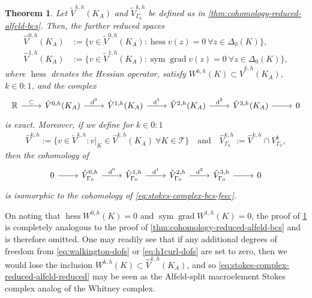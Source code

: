 \documentclass{mcom-l}
\newtheorem{theorem}{Theorem}[section]
\theoremstyle{definition}
\theoremstyle{remark}
\numberwithin{equation}{section}
\DeclareMathOperator{\grad}{grad}
\DeclareMathOperator{\hess}{hess}
\DeclareMathOperator{\dee}{d}
\DeclareMathOperator{\sym}{sym}
\newcommand{\mesh}[0]{\mathcal{T}}
\begin{document}
\begin{theorem}
	\label{thm:cohomology-reduced-alfeld-reduced-bcs}
	Let $\tilde{V}^{k, h}(K_A)$ and $\tilde{V}_{\Gamma_0}^{k ,h}$ be defined as 
	in \cref{thm:cohomology-reduced-alfeld-bcs}. Then, the further reduced 
	spaces 
	\begin{subequations}
		\begin{align}
			\hat{V}^{0, h}(K_A) &:= \{ v \in \tilde{V}^{0, h}(K_A) : 
			\hess v(z) = 0 
			\ \forall z \in \Delta_0(K) \}, \\
			\hat{V}^{1, h}(K_A) &:= \{ v \in \tilde{V}^{1, h}(K_A) : 
			\sym\grad v(z) = 0 
			\ \forall z \in \Delta_0(K)  \},
		\end{align}
	\end{subequations}
	where $\hess$ denotes the Hessian operator,
	satisfy $W^{k, h}(K) \subset \hat{V}^{k, h}(K_A)$, $k \in 0:1$,
	and the complex 
	\begin{equation}
		\label{eq:stokes-complex-reduced-alfeld-reduced-element}
		\begin{tikzcd}
			\mathbb{R} \arrow[r, "\subset"] 
			& \hat{V}^{0, h}(K_A) \arrow[r, "\dee^0"] 
			& \hat{V}^{1, h}(K_A) \arrow[r, "\dee^1"] 
			& \tilde{V}^{2, h}(K_A) \arrow[r, "\dee^2"]
			& \tilde{V}^{3, h}(K_A) \arrow[r]
			& 0
		\end{tikzcd}
	\end{equation}
	is exact. Moreover, if we define for $k \in 0:1$
	\begin{align}
		\label{eq:min-h2h1curl-space-reduce}
		\hat{V}^{k, h} := \{ v \in \tilde{V}^{k, h} : 
		v|_{K} \in \hat{V}^{k, h}(K_A) 
		\ \forall K \in \mesh \} 
		\quad \text{and} \quad 
		\hat{V}^{k, h}_{\Gamma_0} := \hat{V}^{k, h} \cap V^k_{\Gamma_0},
	\end{align}
	then the cohomology of 
	\begin{equation}
		\label{eq:stokes-complex-reduced-alfeld-reduced}
		\begin{tikzcd}
			0 \arrow[r] 
			& \hat{V}_{\Gamma_0}^{0, h} \arrow[r, "\dee^0"] 
			& \hat{V}_{\Gamma_0}^{1, h} \arrow[r, "\dee^1"] 
			& \tilde{V}_{\Gamma_0}^{2, h} \arrow[r, "\dee^2"]
			& \tilde{V}_{\Gamma_0}^{3, h} \arrow[r]
			& 0
		\end{tikzcd}
	\end{equation}
	is isomorphic to the cohomology of \cref{eq:stokes-complex-bcs-feec}.
\end{theorem}
On noting that $\hess W^{0, h}(K) = 0$ and $\sym \grad W^{1, h}(K) = 0$,
the proof of \cref{thm:cohomology-reduced-alfeld-reduced-bcs} is completely
analogous to the proof of \cref{thm:cohomology-reduced-alfeld-bcs}
and is therefore omitted. One may readily see that if any additional degrees 
of freedom from \cref{eq:walkington-dofs} or \cref{eq:h1curl-dofs}
are set to zero, then we would lose the inclusion 
$W^{k, h}(K) \subset \hat{V}^{k, h}(K_A)$, and so 
\cref{eq:stokes-complex-reduced-alfeld-reduced} may be seen as the
Alfeld-split macroelement Stokes complex analog of the Whitney complex.
\end{document}
